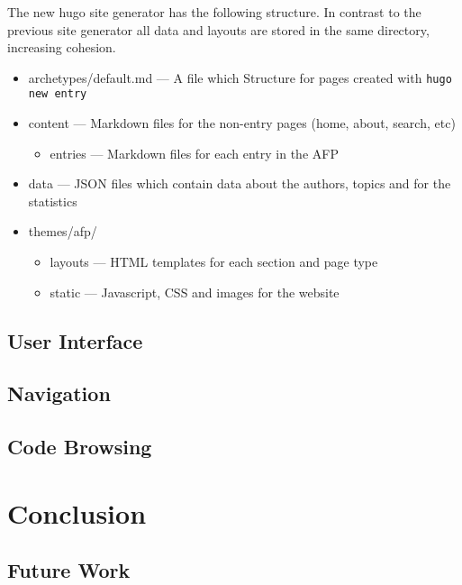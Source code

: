 \documentclass[frontabs,bsc,singlespacing,parskip,deptreport]{infthesis}
\begin{document}
The new hugo site generator has the following structure. In contrast to the previous site generator all data and layouts are stored in the same directory, increasing cohesion. 

\begin{itemize}
    \item archetypes/default.md — A file which Structure for pages created with \verb|hugo new entry|
    \item content — Markdown files for the non-entry pages (home, about, search, etc)
    \begin{itemize}
        \item entries — Markdown files for each entry in the AFP
    \end{itemize}
    \item data — JSON files which contain data about the authors, topics and for the statistics
    \item themes/afp/
    \begin{itemize}
        \item layouts — HTML templates for each section and page type
        \item static — Javascript, CSS and images for the website
    \end{itemize}
\end{itemize}

\section{User Interface}

\section{Navigation}

\section{Code Browsing}

\chapter{Conclusion}

\section{Future Work}



\end{document}
